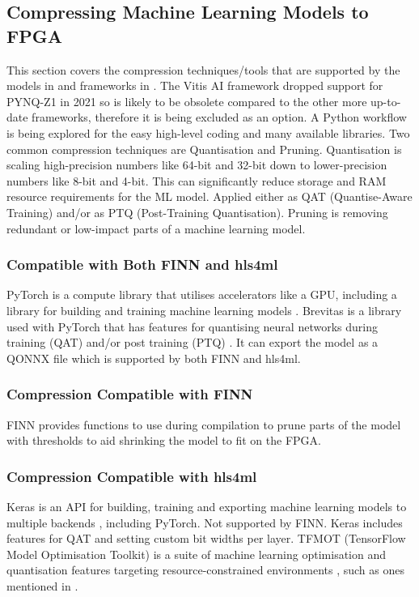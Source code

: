 \documentclass[12pt,nonacm,acmlarge,titlepage,screen]{acmart}
\begin{document}
	\subsection{Compressing Machine Learning Models to FPGA} \label{lit:compression}
	This section covers the compression techniques/tools that are supported by the models in  and frameworks in . The Vitis AI framework dropped support for PYNQ-Z1 in 2021 so is likely to be obsolete compared to the other more up-to-date frameworks, therefore it is being excluded as an option. A Python workflow is being explored for the easy high-level coding and many available libraries. Two common compression techniques are Quantisation and Pruning. Quantisation is scaling high-precision numbers like 64-bit and 32-bit down to lower-precision numbers like 8-bit and 4-bit. This can significantly reduce storage and RAM resource requirements for the ML model. Applied either as QAT (Quantise-Aware Training) and/or as PTQ (Post-Training Quantisation). Pruning is removing redundant or low-impact parts of a machine learning model.
		
		\subsubsection{Compatible with Both FINN and hls4ml}
		PyTorch is a compute library that utilises accelerators like a GPU, including a library for building and training machine learning models \cite{pytorch_paper}. Brevitas is a library used with PyTorch that has features for quantising neural networks during training (QAT) and/or post training (PTQ) \cite{brevitas_src}. It can export the model as a QONNX file which is supported by both FINN and hls4ml.

		\subsubsection{Compression Compatible with FINN}
		FINN provides functions to use during compilation to prune parts of the model with thresholds to aid shrinking the model to fit on the FPGA.

		\subsubsection{Compression Compatible with hls4ml}
		Keras is an API for building, training and exporting machine learning models to multiple backends \cite{keras_site}, including PyTorch. Not supported by FINN. Keras includes features for QAT and setting custom bit widths per layer. TFMOT (TensorFlow Model Optimisation Toolkit) is a suite of machine learning optimisation and quantisation features targeting resource-constrained environments \cite{tfmot_paper}, such as ones mentioned in .
\end{document}
